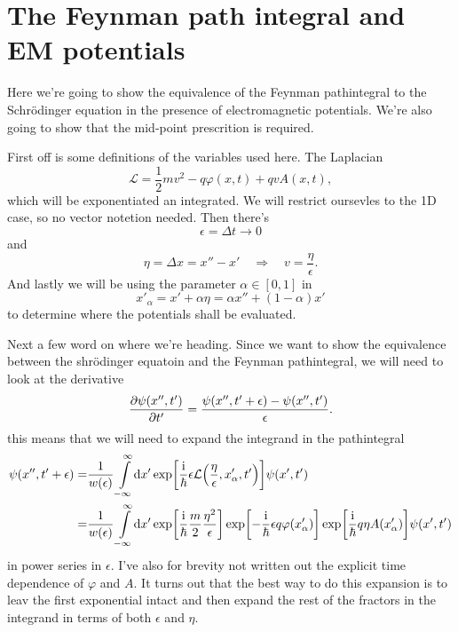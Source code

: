\documentclass[11pt,letter, swedish, english
]{article}
\begin{document}
\section{The Feynman path integral and EM potentials}
Here we're going to show the equivalence of the Feynman pathintegral
to the Schrödinger equation in the presence of electromagnetic
potentials. We're also going to show that the mid-point prescrition is
required. 

First off is some definitions of the variables used here.
The Laplacian
\begin{equation}
\mathcal{L}=\frac{1}{2}m v^2 - q\varphi(x, t) + qvA(x, t),
\end{equation}
which will be exponentiated an integrated. We will restrict oursevles
to the 1D case, so no vector notetion needed. Then there's
\begin{equation}
\epsilon=\Delta{t}\to0
\end{equation}
and
\begin{equation}
\eta=\Delta{x}=x''-x'
\quad\Longrightarrow\quad
v=\frac{\eta}{\epsilon}.
\end{equation}
And lastly we will be using the parameter $\alpha\in[0, 1]$ in
\begin{equation}
x'_\alpha=x'+\alpha\eta=\alpha x'' + (1-\alpha)x'
\end{equation}
to determine where the potentials shall be evaluated.

Next a few word on where we're heading. Since we want to show the
equivalence between the shrödinger equatoin and the Feynman
pathintegral, we will need to look at the derivative
\begin{equation}
\pdv{\psi(x'', t')}{t'} = \frac{\psi(x'', t'+\epsilon)-\psi(x'', t')}{\epsilon}.
\end{equation}
this means that we will need to expand the integrand in the pathintegral
\begin{equation}
\begin{aligned}
\psi(x'', t'+\epsilon)=&\frac{1}{w(\epsilon)}\int_{-\infty}^{\infty}\!\rd{x'}
\exp[\frac{\ii}{\hbar}\epsilon
\mathcal{L}\qty(\frac{\eta}{\epsilon}, x'_\alpha, t')]\psi(x', t')\\
=&\frac{1}{w(\epsilon)}\int_{-\infty}^{\infty}\!\rd{x'}
\exp[\frac{\ii}{\hbar}\frac{m}{2}\frac{\eta^2}{\epsilon}]
\exp[-\frac{\ii}{\hbar}\epsilon q\varphi(x'_\alpha)]
\exp[\frac{\ii}{\hbar} q\eta A(x'_\alpha)]
\psi(x', t')
\end{aligned}
\end{equation}
in power series in $\epsilon$. I've also for brevity not written out
the explicit time dependence of $\varphi$ and $A$. It turns out that
the best way to do this expansion is to leav the first exponential
intact and then expand the rest of the fractors in the integrand in
terms of both $\epsilon$ and $\eta$.
\end{document}
